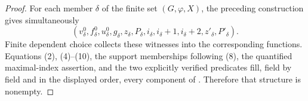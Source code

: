 \begin{proof}
For each member $\delta$ of the finite set
$(G,\varphi,X)$, the preceding construction gives
simultaneously
\[
 (v^0_\delta,f^0_\delta,u^0_\delta,g_\delta,z_\delta,P_\delta,
   i_\delta,i_\delta+1,i_\delta+2,z'_\delta,P'_\delta).
\]
Finite dependent choice collects these witnesses into the corresponding
functions.  Equations (2), (4)--(10), the support memberships following
(8), the quantified maximal-index assertion, and the two explicitly
verified  predicates fill, field by
field and in the displayed order, every component of
.  Therefore that structure is nonempty.
\end{proof}
